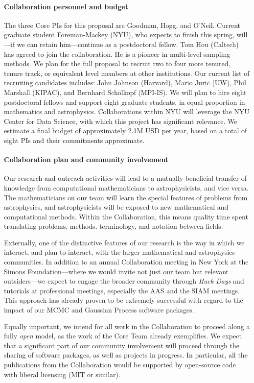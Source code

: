 \documentclass[12pt]{article}
\begin{document}
\paragraph{Collaboration personnel and budget}

The three Core PIs for this proposal are Goodman, Hogg, and O'Neil.
Current graduate student Foreman-Mackey (NYU), who expects to finish
this spring, will---if we can retain him---continue as a postdoctoral
fellow.
Tom Hou (Caltech) has agreed to join the collaboration.
He is a pioneer in multi-level sampling methods.
We plan for the full proposal to recruit two to four more tenured,
tenure track, or equivalent level members at other institutions.  Our
current list of recruiting candidates includes: John
Johnson (Harvard), Mario Juric (UW), Phil Marshall (KIPAC), and Bernhard
Sch\"olkopf (MPI-IS).
We will plan to hire eight postdoctoral fellows and support eight
graduate students, in equal proportion in mathematics and astrophysics.
Collaborations within NYU will leverage the NYU Center for Data Science,
with which this project has significant relevance.
We estimate a final budget of approximately 2.1M USD per year,
based on a total of eight PIs and their commitments approximate.

\paragraph{Collaboration plan and community involvement}

Our research and outreach activities will lead to a mutually beneficial
transfer of knowledge from computational mathematicians to
astrophysicists, and vice versa.
The mathematicians on our team will learn the special features of
problems from astrophysics, and astrophysicists will be exposed to new
mathematical and computational methods.
Within the Collaboration, this means quality time spent translating
problems, methods, terminology, and notation between fields.

Externally, one of the distinctive features of our research is the way
in which we interact, and plan to interact, with the larger mathematical
and astrophysics communities.
In addition to an annual Collaboration meeting in New York at the Simons
Foundation---where we would invite not just our team but relevant
outsiders---we expect to engage the broader community through \emph{Hack
Days} and tutorials at professional meetings, especially the AAS and the SIAM meetings.
This approach has already proven to be extremely successful with regard
to the impact of our MCMC and Gaussian Process software packages.

Equally important, we intend for all work in the Collaboration to
proceed along a fully \emph{open} model, as the work of the Core Team
already exemplifies.
We expect that a significant part of our community involvement will
proceed through the sharing of software packages, as well as projects in
progress.
In particular, all the publications from the Collaboration would be
supported by open-source code with liberal licensing (MIT or similar).
\end{document}
